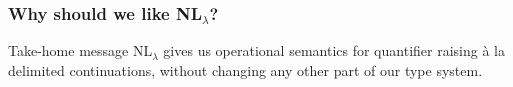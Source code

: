 \documentclass{beamer}
\begin{document}
\begin{frame}
  \frametitle{Why should we like NL$_{\lambda}$?}
  \centering
  \vspace*{2em}
\end{frame}

\begin{frame}
  \begin{block}{Take-home message}
    NL$_\lambda$ gives us operational semantics for quantifier raising \`a la
    delimited continuations, without changing any other part of our type system.
  \end{block} 
\end{frame}
\end{document}

